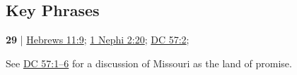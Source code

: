 	
		
		
	
		
		
\subsection{Key Phrases} %
	\label{PROMISE-PHRASES}

	\begin{compactdesc}
		\item[land of promise] \textbf{29} | \hyperref[HEBREWS-11-9]{Hebrews 11:9}; \hyperref[1NEPHI-2-20]{1 Nephi 2:20}; \hyperref[DC57-2]{DC 57:2};
			\begin{compactdesc}
				\item[Bible anchor verses] \phantom{.}
					\begin{compactdesc}
						\item[Hebrews 11:9] 
					\end{compactdesc}
				\item[Commentary] See \hyperref[DC57-1]{DC 57:1--6} for a discussion of Missouri as the land of promise.
			\end{compactdesc}
	\end{compactdesc}
	
